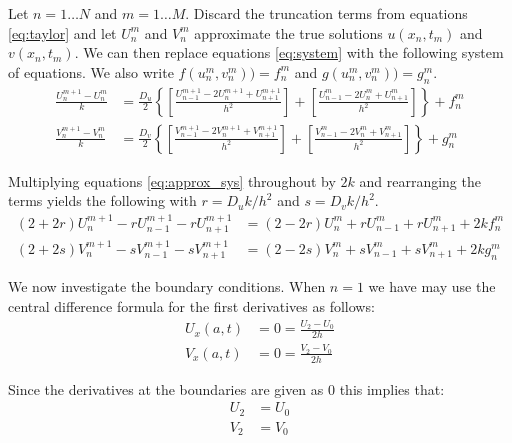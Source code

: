 Let $n = 1 \dots N$ and $m = 1 \dots M$. Discard the truncation terms from
equations \eqref{eq:taylor} and let $U_n^m$ and $V_n^m$ approximate the true
solutions $u(x_n,t_m)$ and $v(x_n,t_m)$.  We can then replace equations
\eqref{eq:system} with the following system of equations. We also write
$f(u_n^m,v_n^m)) = f_n^m$ and $g(u_n^m,v_n^m)) = g_n^m$.
\begin{subequations} \label{eq:approx_sys}
\begin{align}
    \frac{U_{n}^{m+1} - U_{n}^{m}}{k} &=
        \frac{D_u}{2} \left\{
            \left[ \frac{U_{n-1}^{m+1}-2U_{n}^{m+1}+U_{n+1}^{m+1}}{h^2} \right] +
            \left[ \frac{U_{n-1}^{m}-2U_{n}^{m}+U_{n+1}^{m}}{h^2} \right]
        \right\} + f_{n}^{m} \label{eq:approx_prey}
        \\
    \frac{V_{n}^{m+1} - V_{n}^{m}}{k} &=
        \frac{D_v}{2} \left\{
            \left[ \frac{V_{n-1}^{m+1}-2V_{n}^{m+1}+V_{n+1}^{m+1}}{h^2} \right] +
            \left[ \frac{V_{n-1}^{m}-2V_{n}^{m}+V_{n+1}^{m}}{h^2} \right]
        \right\} + g_{n}^{m} \label{eq:approx_pred}
\end{align}
\end{subequations}

Multiplying equations \eqref{eq:approx_sys} throughout by $2k$ and rearranging
the terms yields the following with $r = D_u k / h^2$ and $s = D_v k / h^2$.
\begin{subequations} \label{eq:rearranged_approx_sys}
\begin{align}
    (2+2r) U_{n}^{m+1} - r U_{n-1}^{m+1} - r U_{n+1}^{m+1} &=
        (2-2r) U_{n}^{m} + r U_{n-1}^{m} + r U_{n+1}^{m} + 2k f_{n}^{m}
        \\
    (2+2s) V_{n}^{m+1} - s V_{n-1}^{m+1} - s V_{n+1}^{m+1} &=
        (2-2s) V_{n}^{m} + s V_{n-1}^{m} + s V_{n+1}^{m} + 2k g_{n}^{m}
\end{align}
\end{subequations}

We now investigate the boundary conditions. When $n=1$ we have may use the
central difference formula for the first derivatives as follows:
\begin{subequations}
\begin{align}
    U_x(a,t) &= 0 = \frac{{U_2} - U_{0}}{2h} \\
    V_x(a,t) &= 0 = \frac{{V_2} - V_{0}}{2h}
\end{align}
\end{subequations}

Since the derivatives at the boundaries are given as 0 this implies that:
\begin{subequations} \label{eq:left_end_points}
\begin{align}
    U_{2} &= U_{0} \\
    V_{2} &= V_{0}
\end{align}
\end{subequations}

